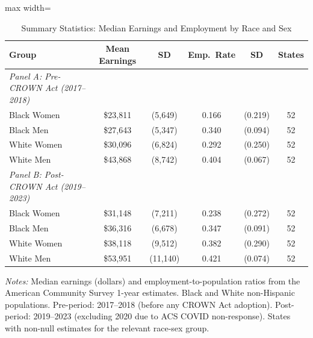 \begin{table}[htbp]
\centering
\caption{Summary Statistics: Median Earnings and Employment by Race and Sex}
\label{tab:sumstats}
\footnotesize
\begin{adjustbox}{max width=\textwidth}
\begin{tabular}{lccccc}
\toprule
Group & Mean Earnings & SD & Emp.\ Rate & SD & States \\
\midrule
\textit{Panel A: Pre-CROWN Act (2017--2018)} &  &  &  &  &  \\
\quad Black Women & \$23,811 & (5,649) & 0.166 & (0.219) & 52 \\
\quad Black Men & \$27,643 & (5,347) & 0.340 & (0.094) & 52 \\
\quad White Women & \$30,096 & (6,824) & 0.292 & (0.250) & 52 \\
\quad White Men & \$43,868 & (8,742) & 0.404 & (0.067) & 52 \\
\midrule
\textit{Panel B: Post-CROWN Act (2019--2023)} &  &  &  &  &  \\
\quad Black Women & \$31,148 & (7,211) & 0.238 & (0.272) & 52 \\
\quad Black Men & \$36,316 & (6,678) & 0.347 & (0.091) & 52 \\
\quad White Women & \$38,118 & (9,512) & 0.382 & (0.290) & 52 \\
\quad White Men & \$53,951 & (11,140) & 0.421 & (0.074) & 52 \\
\bottomrule
\end{tabular}
\end{adjustbox}
\begin{tablenotes}
\item \textit{Notes:} Median earnings (dollars) and employment-to-population ratios from the American Community Survey 1-year estimates. Black and White non-Hispanic populations. Pre-period: 2017--2018 (before any CROWN Act adoption). Post-period: 2019--2023 (excluding 2020 due to ACS COVID non-response). States with non-null estimates for the relevant race-sex group.
\end{tablenotes}
\end{table}
